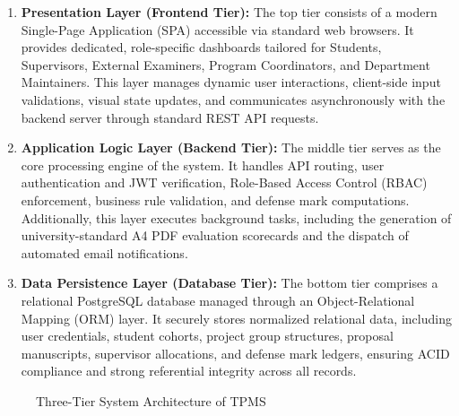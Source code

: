 \documentclass[12pt,a4paper]{report}
\begin{document}
\begin{enumerate}
  \item \textbf{Presentation Layer (Frontend Tier):}  
  The top tier consists of a modern Single-Page Application (SPA) accessible via standard web browsers. It provides dedicated, role-specific dashboards tailored for Students, Supervisors, External Examiners, Program Coordinators, and Department Maintainers. This layer manages dynamic user interactions, client-side input validations, visual state updates, and communicates asynchronously with the backend server through standard REST API requests.

  \item \textbf{Application Logic Layer (Backend Tier):}  
  The middle tier serves as the core processing engine of the system. It handles API routing, user authentication and JWT verification, Role-Based Access Control (RBAC) enforcement, business rule validation, and defense mark computations. Additionally, this layer executes background tasks, including the generation of university-standard A4 PDF evaluation scorecards and the dispatch of automated email notifications.

  \item \textbf{Data Persistence Layer (Database Tier):}  
  The bottom tier comprises a relational PostgreSQL database managed through an Object-Relational Mapping (ORM) layer. It securely stores normalized relational data, including user credentials, student cohorts, project group structures, proposal manuscripts, supervisor allocations, and defense mark ledgers, ensuring ACID compliance and strong referential integrity across all records.
\end{enumerate}

\begin{figure}[H]
\centering
{}
\caption{Three-Tier System Architecture of TPMS}
\label{fig:arch}
\end{figure}
\end{document}
